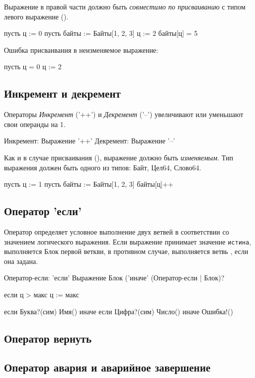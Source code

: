 \bigskip
Выражение в правой части должно быть \emph{совместимо по присваиванию} с типом левого выражение ().

\begin{Trivil}
пусть ц := 0
пусть байты := Байты[1, 2, 3]
ц := 2
байты[ц] = 5
\end{Trivil}

Ошибка присваивания в неизменяемое выражение:
\begin{SampleErr}[vspace=2pt]
пусть ц = 0
ц := 2
\end{SampleErr}

\hypertarget{inc-dec}{%
\subsection{Инкремент и декремент}\label{stmt:inc-dec}}

Операторы \emph{Инкремент} ('++') и \emph{Декремент} ('--') увеличивают или уменьшают свои операнды на 1. 

\begin{Grammar}
Инкремент: Выражение '++'
Декремент: Выражение '--'
\end{Grammar}

Как и в случае присваивания (), выражение должно быть \emph{изменяемым}.
Тип выражения должен быть одного из типов: Байт, Цел64, Слово64.

\begin{Trivil}
пусть ц := 1
пусть байты := Байты[1, 2, 3]
байты[ц]++
\end{Trivil}

\hypertarget{if-stmt}{%
\subsection{Оператор 'если'}\label{stmt:if-stmt}}

Оператор  определяет условное выполнение двух ветвей в соответствии со значением логического выражения. 
Если выражение принимает значение \verb+истина+, выполняется Блок первой веткви, в противном случае, выполняется ветвь , если она задана.

\begin{Grammar}
Оператор-если: 
    'если' Выражение Блок ('иначе' (Оператор-если | Блок)?
\end{Grammar}

\begin{Trivil}
если ц > макс { ц := макс }

если Буква?(сим) { Имя() }
иначе если Цифра?(сим) { Число() }
иначе { Ошибка!() }
\end{Trivil}

\hypertarget{return}{%
\subsection{Оператор вернуть}\label{stmt:return}}

\hypertarget{crash}{%
\subsection{Оператор авария и аварийное завершение}\label{stmt:crash}}